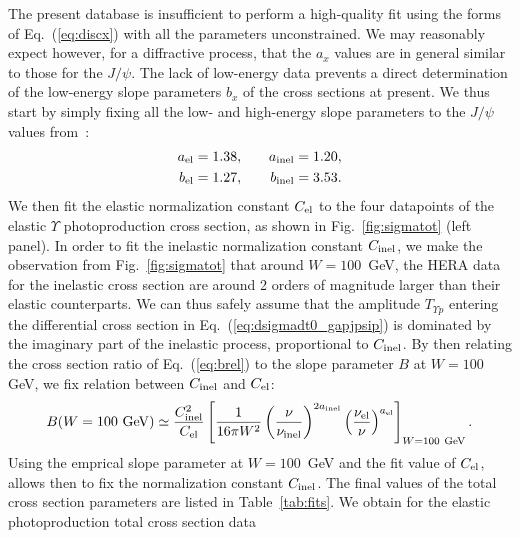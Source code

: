 \documentclass[10pt,prd,aps,nofootinbib,superscriptaddress]{revtex4}
\newcommand{\beq}{\begin{equation}}
\newcommand{\eeq}{\end{equation}}
\newcommand{\bea}{\begin{eqnarray}}
\newcommand{\eea}{\end{eqnarray}}
\begin{document}
The present database is insufficient to perform a high-quality fit using the forms of Eq.~(\ref{eq:discx}) with all the parameters unconstrained.
We may reasonably expect however, for a diffractive process, that the $a_x$ values are in general similar to those for the $J/\psi$.
The lack of low-energy data prevents a direct determination of the low-energy slope parameters $b_x$ of the cross sections at present.
We thus start by simply fixing all the low- and high-energy slope parameters to the $J/\psi$ values from~\cite{Gryniuk:2016mpk}:
\bea
a_{\rm el} = 1.38, &\quad& a_{\rm inel} = 1.20, \\
b_{\rm el} = 1.27, &\quad& b_{\rm inel} = 3.53 .
\eea
We then fit the elastic normalization constant $C_{\rm el}$ to the four datapoints of the elastic $\Upsilon$ photoproduction cross section, as shown in Fig.~\ref{fig:sigmatot} (left panel). 
In order to fit the inelastic normalization constant $C_{\rm inel}$, we make the observation from Fig.~\ref{fig:sigmatot} that around $W = 100$~GeV, the HERA data for the inelastic cross section are around 2 orders of magnitude larger than their elastic counterparts. We can thus safely assume that the amplitude $T_{\Upsilon p}$ entering the differential cross section in Eq.~(\ref{eq:dsigmadt0_gapjpsip}) is dominated by the imaginary part of the inelastic process, proportional to $C_{\rm inel}$. 
By then relating the cross section ratio of Eq.~(\ref{eq:brel}) to the slope parameter $B$ at $W=100$ GeV, 
we fix relation between $C_{\rm inel}$ and $C_{\rm el}$:
\beq
B (W = 100~{\rm GeV}) \simeq  
 \frac{C_{\rm inel}^2}{C_{\rm el}} \left[ \frac{1}{16 \pi W^2} \left( \frac{\nu}{\nu_{\rm inel}} \right)^{2 a_{\rm inel}} 
\left( \frac{\nu_{\rm el}}{\nu} \right)^{a_{\rm el}} \right]_{W = 100~{\rm GeV} } . 
\label{eq:Crel}
\eeq
Using the emprical slope parameter at $W = 100$~GeV and the fit value of $C_{\rm el}$, allows then to fix the normalization constant $C_{\rm inel}$. 
The final values of the total cross section parameters are listed in Table~\ref{tab:fits}. 
We obtain for the elastic photoproduction total cross section data 
\end{document}
